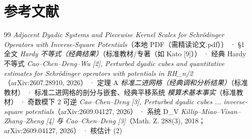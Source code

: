 \documentclass[a4paper,11pt,openany]{ctexbook}
\numberwithin{equation}{chapter}
\numberwithin{figure}{chapter}
\numberwithin{table}{chapter}
\begin{document}
\chapter*{参考文献}
\begingroup\small
\begin{thebibliography}{99}
 \emph{Adjacent Dyadic Systems and Piecewise Kernel Scales for Schrödinger Operators with Inverse-Square Potentials}（本地 PDF（需精读论文.pdf）） · §1 全文
 \emph{Hardy 不等式（经典结果）}（标准教材/专著（如 Kato [9]）） · 经典 Hardy 不等式
 \emph{Cao–Chen–Deng–Wu [2], Perturbed dyadic cubes and quantitative estimates for Schrödinger operators with potentials in RH\_{n/2}}（arXiv:2607.28910, 2026） · 定理 A
 \emph{标准二进网格（经典调和分析结果）}（标准教材） · 标准二进网格的剖分与嵌套、经典平移系统
 \emph{模算术基本事实}（标准教材） · 奇数模下 2 可逆
 \emph{Cao–Chen–Deng [3], Perturbed dyadic cubes ... inverse-square potentials}（arXiv:2609.04127, 2026） · 系统 D\_V
 \emph{Killip–Miao–Visan–Zhang–Zheng [4] 与 Cao–Chen–Deng [3]}（Math. Z. 288(3), 2018；arXiv:2609.04127, 2026） · 核估计 (2)
\end{thebibliography}
\endgroup
\end{document}
